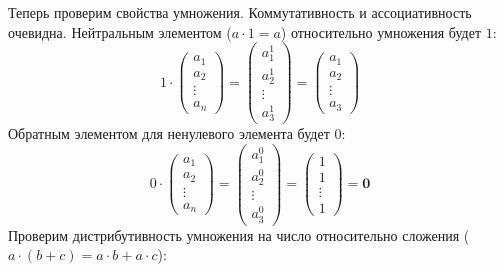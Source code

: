 \documentclass[a4paper, 12pt]{article}
\begin{document}
Теперь проверим свойства умножения. Коммутативность и ассоциативность очевидна. Нейтральным элементом ($a \cdot 1 = a$) относительно умножения будет $1$:
\[
1 \cdot
\begin{pmatrix}
    a_1 \\ 
    a_2 \\  
    \vdots \\
    a_n
\end{pmatrix}
= 
\begin{pmatrix}
    a_1^1 \\ 
    a_2^1 \\  
    \vdots \\
    a_3^1
\end{pmatrix}
=
\begin{pmatrix}
    a_1 \\ 
    a_2 \\  
    \vdots \\
    a_3
\end{pmatrix}
\]
Обратным элементом для ненулевого элемента будет $0$:
\[
0 \cdot
\begin{pmatrix}
    a_1 \\ 
    a_2 \\  
    \vdots \\
    a_n
\end{pmatrix}
= 
\begin{pmatrix}
    a_1^0 \\ 
    a_2^0 \\  
    \vdots \\
    a_3^0
\end{pmatrix} = 
\begin{pmatrix}
    1 \\ 
    1 \\  
    \vdots \\
    1
\end{pmatrix} = \mathbf{0}
\]
Проверим дистрибутивность умножения на число относительно сложения ($a \cdot (b + c) = a \cdot b + a \cdot c$):
\end{document}
